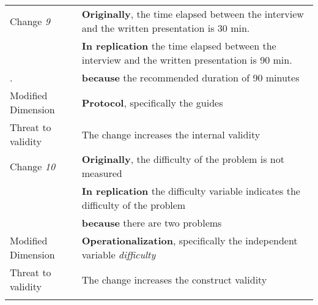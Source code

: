 \begin{table*}[h]
\begin{tabularx}{\textwidth}{
  >{\hsize=0.3\hsize}X
  >{\hsize=0.8\hsize}X}
 
     Change \textit{9}   & \textbf{Originally}, the  time  elapsed  between  the  interview  and the  written  presentation is  30 min. \\& \textbf{In replication} the  time  elapsed  between  the  interview  and the  written  presentation is  90 min. \\.  
    & \textbf{because} the recommended duration of 90 minutes \\ 

    Modified Dimension & 
    \textbf{Protocol}, specifically the guides \\ 
    Threat to validity & The change increases the internal validity  \\  \hline

    Change \textit{10}   & \textbf{Originally}, the difficulty of the problem is not measured \\& \textbf{In replication} the difficulty variable indicates the difficulty of the problem \\& \textbf{because} there are two problems  \\ 

    Modified Dimension & 
   \textbf{Operationalization}, specifically the independent variable \textit {difficulty} \\ 
     Threat to validity  & The change increases the construct validity \\ 
   \noalign{\smallskip\smallskip}\hline
    
	\end{tabularx}  
	
\end{table*}